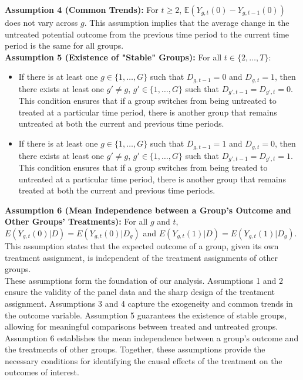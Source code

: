 \documentclass[10pt, oneside]{book}
\begin{document}
\textbf{Assumption 4 (Common Trends):} For $t \geq 2$, $\mathbb{E}(Y_{g,t}(0) - Y_{g,t-1}(0))$ does not vary across $g$. This assumption implies that the average change in the untreated potential outcome from the previous time period to the current time period is the same for all groups. \\

\textbf{Assumption 5 (Existence of "Stable" Groups):} For all $t \in \{2, \ldots, T\}$:
\begin{itemize}
    \item If there is at least one $g \in \{1, \ldots, G\}$ such that $D_{g,t-1} = 0$ and $D_{g,t} = 1$, then there exists at least one $g' \neq g$, $g' \in \{1, \ldots, G\}$ such that $D_{g',t-1} = D_{g',t} = 0$. This condition ensures that if a group switches from being untreated to treated at a particular time period, there is another group that remains untreated at both the current and previous time periods.
    \item If there is at least one $g \in \{1, \ldots, G\}$ such that $D_{g,t-1} = 1$ and $D_{g,t} = 0$, then there exists at least one $g' \neq g$, $g' \in \{1, \ldots, G\}$ such that $D_{g',t-1} = D_{g',t} = 1$. This condition ensures that if a group switches from being treated to untreated at a particular time period, there is another group that remains treated at both the current and previous time periods.
\end{itemize}

\textbf{Assumption 6 (Mean Independence between a Group's Outcome and Other Groups' Treatments):} For all $g$ and $t$, $E(Y_{g,t}(0)|D) = E(Y_{g,t}(0)|D_g)$ and $E(Y_{g,t}(1)|D) = E(Y_{g,t}(1)|D_g)$. This assumption states that the expected outcome of a group, given its own treatment assignment, is independent of the treatment assignments of other groups. \\

These assumptions form the foundation of our analysis. Assumptions 1 and 2 ensure the validity of the panel data and the sharp design of the treatment assignment. Assumptions 3 and 4 capture the exogeneity and common trends in the outcome variable. Assumption 5 guarantees the existence of stable groups, allowing for meaningful comparisons between treated and untreated groups. Assumption 6 establishes the mean independence between a group's outcome and the treatments of other groups. Together, these assumptions provide the necessary conditions for identifying the causal effects of the treatment on the outcomes of interest. \\
\end{document}
